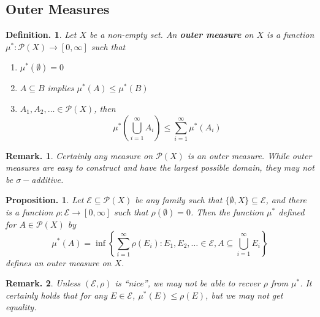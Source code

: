 \documentclass[11pt, a4paper]{memoir}
\theoremstyle{change}
\newtheorem{proposition}[theorem]{Proposition.}
\theoremstyle{plain}
\theoremstyle{nonumberplain}
\newtheorem{definition}{Definition.}
\newtheorem{remark}{Remark.}
\numberwithin{equation}{section}
\begin{document}
\subsection{Outer Measures}
\begin{definition}
    Let $X$ be a non-empty set.
    An \textbf{outer measure} on $X$ is a function $\mu^*:\mathcal{P}(X)\to[0,\infty]$ such that
    \begin{enumerate}[nl,r]
        \item $\mu^*(\emptyset)=0$
        \item $A\subseteq B$ implies $\mu^*(A)\leq\mu^*(B)$
        \item $A_1,A_2,\ldots\in \mathcal{P}(X)$, then
            \begin{equation*}\mu^*\left(\bigcup\limits_{i=1}^\infty A_i\right)\leq\sum\limits_{i=1}^\infty \mu^*(A_i)\end{equation*}
    \end{enumerate}
\end{definition}
\begin{remark}
    Certainly any measure on $\mathcal{P}(X)$ is an outer measure.
    While outer measures are easy to construct and have the largest possible domain, they may not be $\sigma-$additive.
\end{remark}
\begin{proposition}\label{prop:def-outer}
    Let $\mathcal{E}\subseteq\mathcal{P}(X)$ be any family such that $\{\emptyset,X\}\subseteq\mathcal{E}$, and there is a function $\rho:\mathcal{E}\to[0,\infty]$ such that $\rho(\emptyset)=0$.
    Then the function $\mu^*$ defined for $A\in\mathcal{P}(X)$ by
    \begin{equation*}
        \mu^*(A)=\inf\left\{\sum\limits_{i=1}^\infty \rho(E_i):E_1,E_2,\ldots\in\mathcal{E}, A\subseteq\bigcup\limits_{i=1}^\infty E_i\right\}
    \end{equation*}
    defines an outer measure on $X$.
\end{proposition}
\begin{remark}
    Unless $(\mathcal{E},\rho)$ is ``nice'', we may not be able to recver $\rho$ from $\mu^*$.
    It certainly holds that for any $E\in\mathcal{E}$, $\mu^*(E)\leq\rho(E)$, but we may not get equality.
\end{remark}
\end{document}
